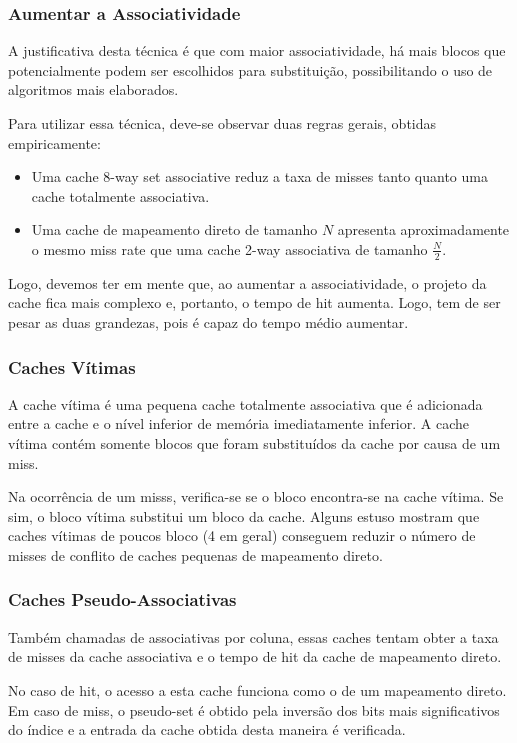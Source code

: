 \subsubsection{Aumentar a Associatividade}
A justificativa desta técnica é que com maior associatividade, há mais blocos que potencialmente podem ser escolhidos para substituição, possibilitando o uso de algoritmos mais elaborados.

Para utilizar essa técnica, deve-se observar duas regras gerais, obtidas empiricamente:
\begin{itemize}
  \item Uma cache 8-way set associative reduz a taxa de misses tanto quanto uma cache totalmente associativa.

  \item Uma cache de mapeamento direto de tamanho $N$ apresenta aproximadamente o mesmo miss rate que uma cache 2-way associativa de tamanho $\frac{N}{2}$.
\end{itemize}

Logo, devemos ter em mente que, ao aumentar a associatividade, o projeto da cache fica mais complexo e, portanto, o tempo de hit aumenta. Logo, tem de ser pesar as duas grandezas, pois é capaz do tempo médio aumentar.


\subsubsection{Caches Vítimas}
A cache vítima é uma pequena cache totalmente associativa que é adicionada entre a cache e o nível inferior de memória imediatamente inferior. A cache vítima contém somente blocos que foram substituídos da cache por causa de um miss.

Na ocorrência de um misss, verifica-se se o bloco encontra-se na cache vítima. Se sim, o bloco vítima substitui um bloco da cache. Alguns estuso mostram que caches vítimas de poucos bloco (4 em geral) conseguem reduzir o número de misses de conflito de caches pequenas de mapeamento direto.



\subsubsection{Caches Pseudo-Associativas}
Também chamadas de associativas por coluna, essas caches tentam obter a taxa de misses da cache associativa e o tempo de hit da cache de mapeamento direto.

No caso de hit, o acesso a esta cache funciona como o de um mapeamento direto. Em caso de miss, o pseudo-set é obtido pela inversão dos bits mais significativos do índice e a entrada da cache obtida desta maneira é verificada.


